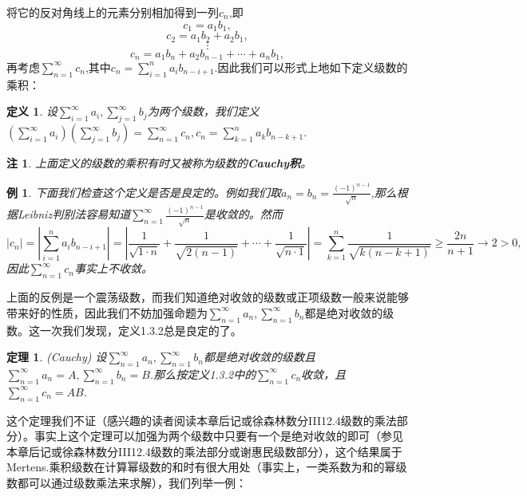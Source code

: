 \documentclass{article}
\newtheorem{definition}{定义}[subsection]
\newtheorem{theorem}{定理}[subsection]
\newtheorem{example}{例}[subsection]
\newtheorem{note}{注}[subsection]
\begin{document}
将它的反对角线上的元素分别相加得到一列$c_n$,即
$$
c_1=a_1b_1,
$$
$$
c_2=a_1b_2+a_2b_1,
$$
$$
\vdots 
$$
$$
c_n=a_1b_n+a_2b_{n-1}+\cdots +a_nb_1,
$$
再考虑$\sum_{n=1}^\infty c_n$,其中$c_n=\sum_{i=1}^na_ib_{n-i+1}$.因此我们可以形式上地如下定义级数的乘积：
\begin{definition}
设$\sum_{i=1}^\infty a_i,\sum_{j=1}^\infty b_j$为两个级数，我们定义$\left( \sum_{i=1}^{\infty}{a_i} \right) \left( \sum_{j=1}^{\infty}{b_j} \right) =\sum_{n=1}^{\infty}{c_n},c_n=\sum_{k=1}^n{a_kb_{n-k+1}}.$
\end{definition}
\begin{note}
上面定义的级数的乘积有时又被称为级数的\textbf{Cauchy积}。
\end{note}
\begin{example}
下面我们检查这个定义是否是良定的。例如我们取$a_n=b_n=\frac{\left( -1 \right) ^{n-1}}{\sqrt{n}}$,那么根据Leibniz判别法容易知道$\sum_{n=1}^\infty\frac{(-1)^{n-1}}{\sqrt{n}}$是收敛的。然而
$$
\left| c_n \right|=\left| \sum_{i=1}^n{a_ib_{n-i+1}} \right|=\left| \frac{1}{\sqrt{1\cdot n}}+\frac{1}{\sqrt{2\left( n-1 \right)}}+\cdots +\frac{1}{\sqrt{n\cdot 1}} \right|=\sum_{k=1}^n{\frac{1}{\sqrt{k\left( n-k+1 \right)}}}\ge \frac{2n}{n+1}\rightarrow 2>0,
$$
因此$\sum_{n=1}^\infty c_n$事实上不收敛。
\end{example}
上面的反例是一个震荡级数，而我们知道绝对收敛的级数或正项级数一般来说能够带来好的性质，因此我们不妨加强命题为$\sum_{n=1}^\infty a_n,\sum_{n=1}^\infty b_n$都是绝对收敛的级数。这一次我们发现，定义1.3.2总是良定的了。
\begin{theorem}(Cauchy)
设$\sum_{n=1}^\infty a_n,\sum_{n=1}^\infty b_n$都是绝对收敛的级数且$\sum_{n=1}^\infty a_n=A,\sum_{n=1}^\infty b_n=B$.那么按定义1.3.2中的$\sum_{n=1}^\infty c_n$收敛，且$\sum_{n=1}^\infty c_n=AB$.
\end{theorem}
这个定理我们不证（感兴趣的读者阅读本章后记或徐森林数分III12.4级数的乘法部分）。事实上这个定理可以加强为两个级数中只要有一个是绝对收敛的即可（参见本章后记或徐森林数分III12.4级数的乘法部分或谢惠民级数部分），这个结果属于Mertens.乘积级数在计算幂级数的和时有很大用处（事实上，一类系数为和的幂级数都可以通过级数乘法来求解），我们列举一例：
\end{document}
